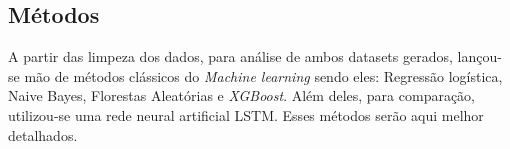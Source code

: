 
\subsection{Métodos}

A partir das limpeza dos dados, para análise de ambos datasets gerados, lançou-se mão de métodos clássicos do \textit{Machine learning} sendo eles: Regressão logística, Naive Bayes, Florestas Aleatórias e \textit{XGBoost}. Além deles, para comparação, utilizou-se uma rede neural artificial LSTM. Esses métodos serão aqui melhor detalhados.

















